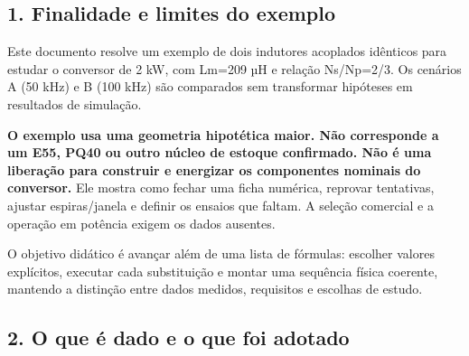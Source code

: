 \documentclass[
]{article}
\author{}
\date{}
\begin{document}
\subsection{1. Finalidade e limites do
exemplo}\label{finalidade-e-limites-do-exemplo}

Este documento resolve um exemplo de dois indutores acoplados idênticos
para estudar o conversor de 2 kW, com Lm=209 µH e relação Ns/Np=2/3. Os
cenários A (50 kHz) e B (100 kHz) são comparados sem transformar
hipóteses em resultados de simulação.

\textbf{O exemplo usa uma geometria hipotética maior. Não corresponde a
um E55, PQ40 ou outro núcleo de estoque confirmado. Não é uma liberação
para construir e energizar os componentes nominais do conversor.} Ele
mostra como fechar uma ficha numérica, reprovar tentativas, ajustar
espiras/janela e definir os ensaios que faltam. A seleção comercial e a
operação em potência exigem os dados ausentes.

O objetivo didático é avançar além de uma lista de fórmulas: escolher
valores explícitos, executar cada substituição e montar uma sequência
física coerente, mantendo a distinção entre dados medidos, requisitos e
escolhas de estudo.

\subsection{2. O que é dado e o que foi
adotado}\label{o-que-uxe9-dado-e-o-que-foi-adotado}
\end{document}
